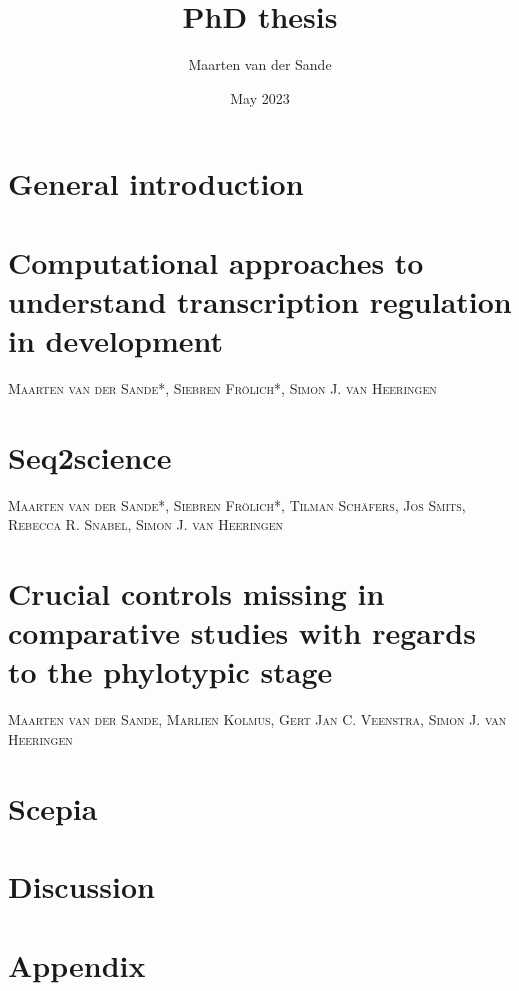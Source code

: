 \documentclass{book}
\title{PhD thesis}
\author{Maarten van der Sande}
\date{May 2023}
\makeatletter
\newcommand{\chapterauthor}[1]{%
  {\parindent0pt\vspace*{-25pt}%
  \linespread{1.1}\large\scshape#1%
  \par\nobreak\vspace*{35pt}}
  \@afterheading%
}
\makeatother
\begin{document}
\maketitle

\tableofcontents
\chapter{General introduction}



\chapter{Computational approaches to understand transcription regulation in development}
\chapterauthor{Maarten van der Sande*, Siebren Fr{\"o}lich*, Simon J. van Heeringen}


\chapter{Seq2science}
\chapterauthor{Maarten van der Sande*, Siebren Fr{\"o}lich*, Tilman Sch{\"a}fers, Jos Smits, Rebecca R. Snabel, Simon J. van Heeringen}

\chapter{Crucial controls missing in comparative studies with regards to the phylotypic stage}
\chapterauthor{Maarten van der Sande, Marlien Kolmus, Gert Jan C. Veenstra, Simon J. van Heeringen}


\chapter{Scepia}

\chapter{Discussion}


\chapter{Appendix}


\end{document}

